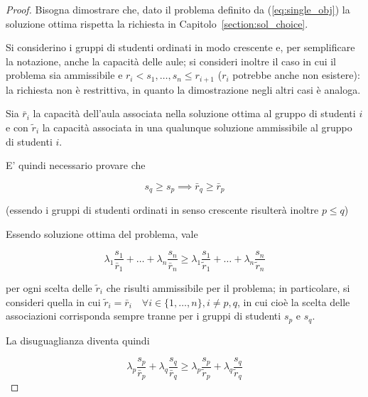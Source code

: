 \begin{proof}
    Bisogna dimostrare che, dato il problema definito da (\ref{eq:single_obj})
    la soluzione ottima rispetta la richiesta in Capitolo~\ref{section:sol_choice}.
    
    Si considerino i gruppi di studenti ordinati in modo crescente e, per 
    semplificare la notazione, anche la capacità delle aule;
    si consideri inoltre il caso in cui il problema sia ammissibile e $r_i < s_1, \dots, s_n \leq r_{i+1}$ ($r_i$ potrebbe 
    anche non esistere): la richiesta non è restrittiva, in quanto la dimostrazione negli 
    altri casi è analoga.

    Sia $\bar{r}_i$ la capacità dell'aula associata nella soluzione 
    ottima al gruppo di studenti $i$ e con $\tilde{r}_i$ la capacità associata in una 
    qualunque soluzione ammissibile al gruppo di studenti $i$.

    E' quindi necessario provare che 
    
    \begin{equation}
        s_q \geq s_p \implies \bar{r}_q \geq \bar{r}_p    
        \label{eq:}
    \end{equation}

    \noindent
    (essendo i gruppi di studenti ordinati in senso crescente risulterà inoltre $p \leq q$)
    
    Essendo soluzione ottima del problema, vale
    
    \begin{equation*}
        \lambda_1 \frac{s_1}{\bar{r}_1} + \dots + \lambda_{n} \frac{s_{n}}{\bar{r}_{n}} \geq
        \lambda_1 \frac{s_1}{\tilde{r}_1} + \dots + \lambda_{n} \frac{s_{n}}{\tilde{r}_{n}}
        \label{eq:}
    \end{equation*}
    
    \noindent
    per ogni scelta delle $\tilde{r}_i$ che risulti ammissibile per il problema; in particolare, 
    si consideri quella in cui $\tilde{r}_i = \bar{r}_i \quad \forall i \in \{1, \dots, n\}, i \neq p, q$,
    in cui cioè la scelta delle associazioni corrisponda sempre tranne per i gruppi di studenti 
    $s_p$ e $s_q$.
    
    La disuguaglianza diventa quindi
    
    \begin{equation*}
        \lambda_p \frac{s_p}{\bar{r}_p} + \lambda_{q} \frac{s_{q}}{\bar{r}_{q}} \geq
        \lambda_p \frac{s_p}{\tilde{r}_p} + \lambda_{q} \frac{s_{q}}{\tilde{r}_{q}}
        \label{eq:}
    \end{equation*}
    

\end{proof}
